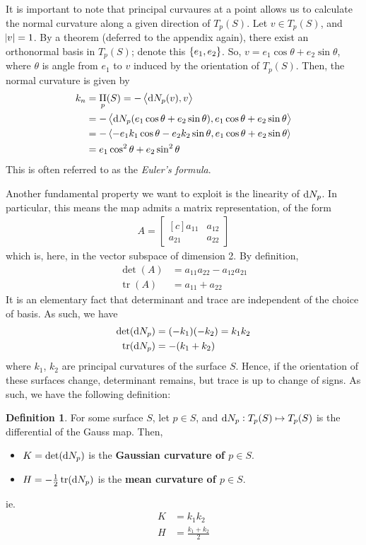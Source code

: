 \documentclass{amsart} %
\theoremstyle{mytheoremstyle}
\theoremstyle{definition}
\newtheorem{definition}{Definition}[section]
\numberwithin{equation}{section}
\DeclareMathOperator{\II}{II}
\DeclareMathOperator{\1}{\mathbbm{1}}
\DeclareMathOperator{\D}{\dif}
\DeclareMathOperator{\tr}{tr}
\newcommand{\innerproduct}[2]{\left\langle #1,#2 \right\rangle}
\begin{document}
It is important to note that principal curvaures at a point allows us to calculate the normal curvature along a given direction of $T_p (S)$. Let $v \in T_p (S)$, and $\abs{v} = 1$. By a theorem (deferred to the appendix again), there exist an orthonormal basis in $T_p (S)$; denote this $\set{e_1,e_2}$. So, $v = e_1 \cos \theta + e_2 \sin \theta$, where $\theta $ is angle from $e_1 $ to $v$ induced by the orientation of $T_p (S)$. Then, the normal curvature is given by
\begin{align*}
	k_n &= \II_p (S) = - \innerproduct{\D N_p (v)}{v} \\
	&= -\innerproduct{\D N_p (e_1 \cos \theta + e_2 \sin \theta )}{e_1 \cos \theta + e_2 \sin \theta} \\
	&= -\innerproduct{-e_1 k_1  \cos \theta - e_2 k_2 \sin \theta }{e_1 \cos \theta + e_2 \sin \theta} \\
	&= e_1 \cos^2 \theta + e_2 \sin^2 \theta
\end{align*}
This is often referred to as the \textit{Euler's formula}.

Another fundamental property we want to exploit is the linearity of $\D N_p$. In particular, this means the map admits a matrix representation, of the form
\begin{align*}
A = \begin{bmatrix*}[c]
a_{11} & a_{12} \\ a_{21} & a_{22}
\end{bmatrix*}
\end{align*}
which is, here, in the vector subspace of dimension 2. By definition, 
\begin{align*}
\det (A) &= a_{11} a_{22} - a_{12} a_{21} \\
\tr (A) &= a_{11} + a_{22}
\end{align*}
It is an elementary fact that determinant and trace are independent of the choice of basis. As such, we have
\begin{align*}
\det (\D N_p) &= (-k_1) (-k_2) = k_1 k_2   \\
\tr (\D N_p) &= -(k_1 + k_2)
\end{align*}
where $k_1$, $k_2$ are principal curvatures of the surface $S$. Hence, if the orientation of these surfaces change, determinant remains, but trace is up to change of signs. As such, we have the following definition:

\begin{definition}
	\label{defGaussianmeancurvature}
	For some surface $S$, let $p \in S$, and $\D N_p: T_p (S) \mapsto T_p (S)$ is the differential of the Gauss map. Then,
	\begin{itemize}
		\item $K = \det (\D N_p)$ is the \textbf{Gaussian curvature of $p \in S$}.
		\item $H =- \frac{1}{2} \tr (\D N_p)$ is the \textbf{mean curvature of $p \in S$}.
	\end{itemize}
	ie.
	\begin{align*}
	K &= k_1 k_2 \\
	H &= \frac{k_1 + k_2}{2}
	\end{align*}
\end{definition}
\end{document}
